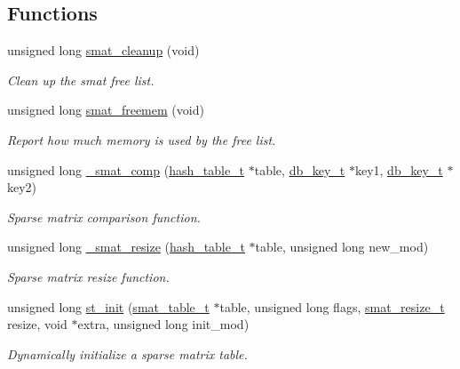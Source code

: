 \subsection*{Functions}
\begin{CompactItemize}
\item 
unsigned long \hyperlink{group__dbprim__smat_ga8}{smat\_\-cleanup} (void)
\begin{CompactList}\small\item\em Clean up the smat free list. \item\end{CompactList}\item 
unsigned long \hyperlink{group__dbprim__smat_ga9}{smat\_\-freemem} (void)
\begin{CompactList}\small\item\em Report how much memory is used by the free list. \item\end{CompactList}\item 
unsigned long \hyperlink{group__dbprim__smat_ga10}{\_\-smat\_\-comp} (\hyperlink{struct__hash__table__s}{hash\_\-table\_\-t} $\ast$table, \hyperlink{struct__db__key__s}{db\_\-key\_\-t} $\ast$key1, \hyperlink{struct__db__key__s}{db\_\-key\_\-t} $\ast$key2)
\begin{CompactList}\small\item\em Sparse matrix comparison function. \item\end{CompactList}\item 
unsigned long \hyperlink{group__dbprim__smat_ga11}{\_\-smat\_\-resize} (\hyperlink{struct__hash__table__s}{hash\_\-table\_\-t} $\ast$table, unsigned long new\_\-mod)
\begin{CompactList}\small\item\em Sparse matrix resize function. \item\end{CompactList}\item 
unsigned long \hyperlink{group__dbprim__smat_ga12}{st\_\-init} (\hyperlink{struct__smat__table__s}{smat\_\-table\_\-t} $\ast$table, unsigned long flags, \hyperlink{group__dbprim__smat_ga3}{smat\_\-resize\_\-t} resize, void $\ast$extra, unsigned long init\_\-mod)
\begin{CompactList}\small\item\em Dynamically initialize a sparse matrix table. \item\end{CompactList}\item 

\end{CompactItemize}
